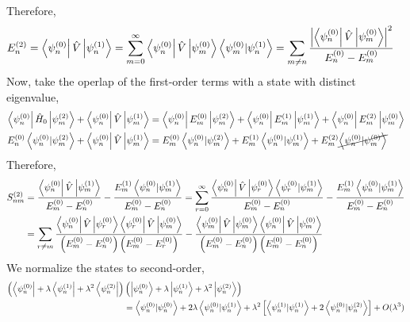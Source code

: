 \documentclass[12pt]{extarticle}
\begin{document}
Therefore,
\begin{align*}
E_n^{(2)} &= \left< \psi^{(0)}_n \right| \hat{V} \left| \psi^{(1)}_n \right> = \sum_{m = 0}^\infty \left< \psi^{(0)}_n \right| \hat{V} \left| \psi^{(0)}_m \right> \left< \psi^{(0)}_m | \psi^{(1)}_n \right> = \sum_{m \neq n} \frac{\left|\left< \psi^{(0)}_n \right| \hat{V} \left| \psi^{(0)}_m \right> \right|^2}{E^{(0)}_n - E^{(0)}_m}
\end{align*}
Now, take the operlap of the first-order terms with a state with distinct eigenvalue, 
\begin{align*}
\left< \psi^{(0)}_n \right| \hat{H}_0 \left| \psi^{(2)}_m \right> + \left< \psi^{(0)}_n \right| \hat{V} \left| \psi^{(1)}_m \right> &= \left< \psi^{(0)}_n \right| E^{(0)}_m \left| \psi^{(2)}_m \right> + \left< \psi^{(0)}_n \right| E^{(1)}_m \left| \psi^{(1)}_m \right> + \left< \psi^{(0)}_n \right| E^{(2)}_m \left| \psi^{(0)}_m \right> \\
E^{(0)}_n \left< \psi^{(0)}_n | \psi^{(2)}_m \right> + \left< \psi^{(0)}_n \right| \hat{V} \left| \psi^{(1)}_m \right> &= E^{(0)}_m \left< \psi^{(0)}_n | \psi^{(2)}_m \right> + E^{(1)}_m \left< \psi^{(0)}_n | \psi^{(1)}_m \right> + E^{(2)}_m \cancel{\left< \psi^{(0)}_n | \psi^{(0)}_m \right>} 
\end{align*}
Therefore,
\begin{align*}
S^{(2)}_{nm} &= \frac{\left< \psi^{(0)}_n \right| \hat{V} \left| \psi^{(1)}_m \right>}{E^{(0)}_m - E^{(0)}_n} - \frac{E^{(1)}_m \left< \psi^{(0)}_n | \psi^{(1)}_m \right>}{E^{(0)}_m - E^{(0)}_n} =   \sum_{r = 0}^\infty \frac{\left< \psi^{(0)}_n \right| \hat{V} \left| \psi^{(0)}_r \right> \left< \psi^{(0)}_r | \psi^{(1)}_m \right>}{E^{(0)}_m - E^{(0)}_n} - \frac{E^{(1)}_m \left< \psi^{(0)}_n | \psi^{(1)}_m \right>}{E^{(0)}_m - E^{(0)}_n} \\ & = \sum_{r \neq m} \frac{\left< \psi^{(0)}_n \right| \hat{V} \left| \psi^{(0)}_r \right> \left< \psi^{(0)}_r \right| \hat{V} \left| \psi^{(0)}_m \right>}{\left(E^{(0)}_m - E^{(0)}_n \right)\left(E^{(0)}_m - E^{(0)}_r \right)} - \frac{\left< \psi^{(0)}_m \right| \hat{V} \left| \psi^{(0)}_m \right> \left< \psi^{(0)}_n \right| \hat{V} \left| \psi^{(0)}_m \right>}{\left(E^{(0)}_m - E^{(0)}_n \right)\left(E^{(0)}_m - E^{(0)}_n \right)}
\end{align*}
We normalize the states to second-order, 
\begin{align*}
\left(\left< \psi^{(0)}_n \right| + \lambda \left< \psi^{(1)}_n \right| + \lambda^2 \left< \psi^{(2)}_n \right| \right) & \left( \left| \psi^{(0)}_n \right> + \lambda \left| \psi^{(1)}_n \right> + \lambda^2 \left| \psi^{(2)}_n \right> \right) \\ & = \left< \psi^{(0)}_n | \psi^{(0)}_n \right> + 2\lambda \left< \psi^{(0)}_n | \psi^{(1)}_n \right> + \lambda^2 \left[ \left< \psi^{(1)}_n | \psi^{(1)}_n \right>  + 2 \left< \psi^{(0)}_n | \psi^{(2)}_n \right> \right] + O(\lambda^3) \\
\end{align*}
\end{document}
